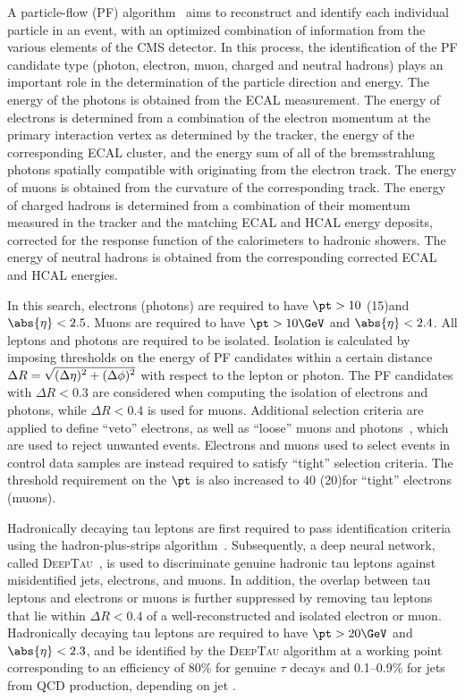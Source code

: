 A particle-flow (PF) algorithm~\cite{CMS:2017yfk} aims to reconstruct and identify each individual particle in an event, with an optimized combination of information from the various elements of the CMS detector. In this process, the identification of the PF candidate type (photon, electron, muon, charged and neutral hadrons) plays an important role in the determination of the particle direction and energy. The energy of the photons is obtained from the ECAL measurement. The energy of electrons is determined from a combination of the electron momentum at the primary interaction vertex as determined by the tracker, the energy of the corresponding ECAL cluster, and the energy sum of all of the bremsstrahlung photons spatially compatible with originating from the electron track. The energy of muons is obtained from the curvature of the corresponding track. The energy of charged hadrons is determined from a combination of their momentum measured in the tracker and the matching ECAL and HCAL energy deposits, corrected for the response function of the calorimeters to hadronic showers. The energy of neutral hadrons is obtained from the corresponding corrected ECAL and HCAL energies. 

In this search, electrons (photons) are required to have $\pt>10$ (15)\GeV and $\abs{\eta}<2.5$. Muons are required to have $\pt>10\GeV$ and $\abs{\eta}<2.4$. All leptons and photons are required to be isolated. Isolation is calculated by imposing thresholds on the energy of PF candidates within a certain distance $\Delta R = \sqrt{\smash[b]{(\Delta\eta)^{2} + (\Delta\phi)^{2}}}$ with respect to the lepton or photon. The PF candidates with $\Delta R < 0.3$ are considered when computing the isolation of electrons and photons, while $\Delta R < 0.4$ is used for muons.
Additional selection criteria are applied to define ``veto'' electrons, as well as ``loose'' muons and photons~\cite{CMS:2020uim,Sirunyan:2018fpa}, which are used to reject unwanted events. 
Electrons and muons used to select events in control data samples are instead required to satisfy ``tight'' selection criteria. The threshold requirement on the $\pt$ is also increased to 40 (20)\GeV for ``tight'' electrons (muons).

Hadronically decaying tau leptons are first required to pass identification criteria using the hadron-plus-strips algorithm~\cite{Khachatryan:2015dfa}. Subsequently, a deep neural network, called \textsc{DeepTau}~\cite{deeptau}, is used to discriminate genuine hadronic tau leptons against misidentified jets, electrons, and muons. In addition, the overlap between tau leptons and electrons or muons is further suppressed by removing tau leptons that lie within $\Delta R < 0.4$ of a well-reconstructed and isolated electron or muon. Hadronically decaying tau leptons are required to have $\pt>20\GeV$ and $\abs{\eta}<2.3$, 
and be identified by the \textsc{DeepTau} algorithm at a working point corresponding to an efficiency of 80\% for genuine $\tau$ decays and 0.1--0.9\% for jets from QCD production, depending on jet \PT.

